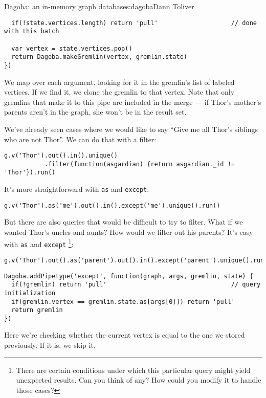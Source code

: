 \begin{aosachapter}{Dagoba: an in-memory graph database}{s:dagoba}{Dann Toliver}
\begin{verbatim}
  if(!state.vertices.length) return 'pull'                    // done with this batch

  var vertex = state.vertices.pop()
  return Dagoba.makeGremlin(vertex, gremlin.state)
})
\end{verbatim}

We map over each argument, looking for it in the gremlin's list of
labeled vertices. If we find it, we clone the gremlin to that vertex.
Note that only gremlins that make it to this pipe are included in the
merge --- if Thor's mother's parents aren't in the graph, she won't be
in the result set.

\label{except}

We've already seen cases where we would like to say ``Give me all Thor's
siblings who are not Thor''. We can do that with a filter:

\begin{verbatim}
g.v('Thor').out().in().unique()
           .filter(function(asgardian) {return asgardian._id != 'Thor'}).run()
\end{verbatim}

It's more straightforward with \texttt{as} and \texttt{except}:

\begin{verbatim}
g.v('Thor').as('me').out().in().except('me').unique().run()
\end{verbatim}

But there are also queries that would be difficult to try to filter.
What if we wanted Thor's uncles and aunts? How would we filter out his
parents? It's easy with \texttt{as} and \texttt{except} \footnote{There
  are certain conditions under which this particular query might yield
  unexpected results. Can you think of any? How could you modify it to
  handle those cases?}:

\begin{verbatim}
g.v('Thor').out().as('parent').out().in().except('parent').unique().run()
\end{verbatim}

\begin{verbatim}
Dagoba.addPipetype('except', function(graph, args, gremlin, state) {
  if(!gremlin) return 'pull'                                  // query initialization
  if(gremlin.vertex == gremlin.state.as[args[0]]) return 'pull'
  return gremlin
})
\end{verbatim}

Here we're checking whether the current vertex is equal to the one we
stored previously. If it is, we skip it.


\end{aosachapter}
